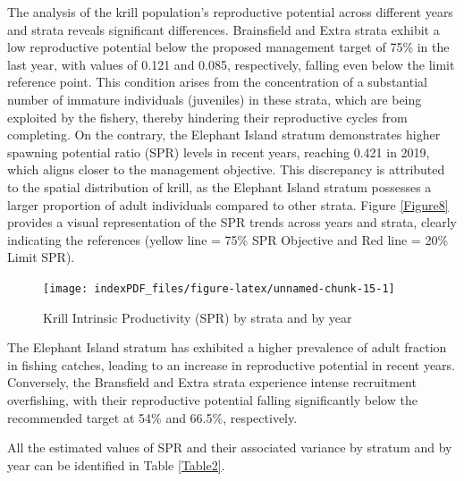 \documentclass[
]{article}
\begin{document}
The analysis of the krill population's reproductive potential across
different years and strata reveals significant differences. Brainsfield
and Extra strata exhibit a low reproductive potential below the proposed
management target of 75\% in the last year, with values of 0.121 and
0.085, respectively, falling even below the limit reference point. This
condition arises from the concentration of a substantial number of
immature individuals (juveniles) in these strata, which are being
exploited by the fishery, thereby hindering their reproductive cycles
from completing. On the contrary, the Elephant Island stratum
demonstrates higher spawning potential ratio (SPR) levels in recent
years, reaching 0.421 in 2019, which aligns closer to the management
objective. This discrepancy is attributed to the spatial distribution of
krill, as the Elephant Island stratum possesses a larger proportion of
adult individuals compared to other strata. Figure \ref{Figure8}
provides a visual representation of the SPR trends across years and
strata, clearly indicating the references (yellow line = 75\% SPR
Objective and Red line = 20\% Limit SPR).

\begin{figure}[H]

{\centering \texttt{[image: indexPDF\_files/figure-latex/unnamed-chunk-15-1]} 

}

\caption{\label{Figure8}Krill Intrinsic Productivity (SPR) by strata and by year}\label{fig:unnamed-chunk-15}
\end{figure}

The Elephant Island stratum has exhibited a higher prevalence of adult
fraction in fishing catches, leading to an increase in reproductive
potential in recent years. Conversely, the Bransfield and Extra strata
experience intense recruitment overfishing, with their reproductive
potential falling significantly below the recommended target at 54\% and
66.5\%, respectively.

All the estimated values of SPR and their associated variance by stratum
and by year can be identified in Table \ref{Table2}.
\end{document}
